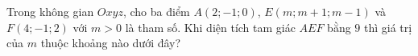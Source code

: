 \begin{ex}
Trong không gian $Oxyz$, cho ba điểm $A(2;-1;0)$, $E(m;m+1;m-1)$ và $F(4;-1;2)$ với $m>0$ là tham số. Khi diện tích tam giác $AEF$ bằng $9$ thì giá trị của $m$ thuộc khoảng nào dưới đây?
\end{ex}
